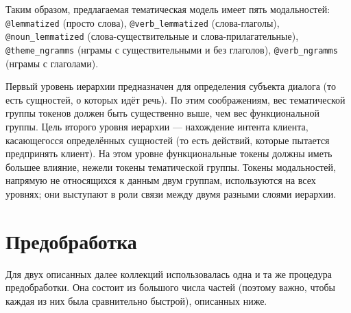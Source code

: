 Таким образом, предлагаемая тематическая модель имеет пять модальностей: \texttt{@lemmatized} (просто слова), \texttt{@verb\_lemmatized} (слова-глаголы), \texttt{@noun\_lemmatized} (слова-существительные и слова-прилагательные), \texttt{@theme\_ngramms} (нграмы с существительными и без глаголов), \texttt{@verb\_ngramms} (нграмы с глаголами).


\par Первый уровень иерархии предназначен для определения субъекта диалога (то есть сущностей, о которых идёт речь). По этим соображениям, вес тематической группы токенов должен быть существенно выше, чем вес функциональной группы. Цель второго уровня иерархии --- нахождение интента клиента, касающегосся определённых сущностей (то есть действий, которые пытается предпринять клиент). На этом уровне функциональные токены должны иметь большее влияние, нежели токены тематической группы. Токены модальностей, напрямую не относящихся к данным двум группам, используются на всех уровнях; они выступают в роли связи между двумя разными слоями иерархии.

\section{Предобработка} \label{nlp_methods}

Для двух описанных далее коллекций использовалась одна и та же процедура предобработки. Она состоит из большого числа частей (поэтому важно, чтобы каждая из них была сравнительно быстрой), описанных ниже.

